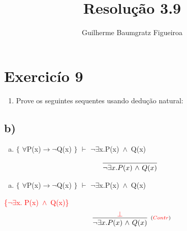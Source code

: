 \documentclass[aspectratio=43]{beamer}
\title[\sc{Resolu\c c\~ao}]{Resolu\c c\~ao 3.9}
\author[Guilherme Baumgratz Figueiroa]{Guilherme Baumgratz Figueiroa}
\institute[UFOP]{Universidade Federal de Ouro Preto} %
\date{}
\newcommand{\ria}{$\rightarrow$}
\newcommand{\fall}{$\forall$}
\newcommand{\ex}{$\exists$}
\newcommand{\nao}{$\neg$}
\newcommand{\nex}{\nao\ex}
\newcommand{\andd}{$\wedge$}
\begin{document}
	
	\begin{frame}
		\titlepage
	\end{frame}
	
	\section{Exercic\'io 9}
	
	\begin{frame}%
    
    	\begin{enumerate}[1.]
			\item Prove os seguintes sequentes usando dedu\c c\~ao natural: \\
		\end{enumerate}
				
	\end{frame}
    \subsection{b)}
    
	\begin{frame}[fragile]
    	
    	\begin{enumerate}[b)]
			
			\item $\{$ \fall P(x)\ria \nao Q(x) $\}$ $\vdash$ \nex  x.P(x)\ \andd\ Q(x) \\ 
			
		\end{enumerate}
        \vspace{100pt}
        \[
        \begin{array}{c}
		
        	\infer[_{}]
            {$\nex$  x. P(x)\ $\andd$\ Q(x)}
            {}
        
		\end{array}
        \]
        
	\end{frame}
    
    \begin{frame}[fragile]
    	
    	\begin{enumerate}[b)]
			
			\item $\{$ \fall P(x)\ria \nao Q(x) $\}$ $\vdash$ \nex  x.P(x)\ \andd\ Q(x) \\ 
			
		\end{enumerate}
        \textcolor{red}{\{\nex  x. P(x)\ \andd\ Q(x)\}}
        \vspace{95pt}
        \[
        \begin{array}{c}
		
        	\infer[_{(\textcolor{red}{Contr})}]
            {$\nex$  x. P(x)\ $\andd$\ Q(x)}
            {\textcolor{red}{\bot}}
        
		\end{array}
        \]
        
	\end{frame}
    
\end{document}

